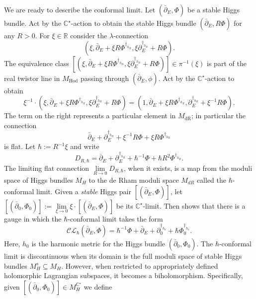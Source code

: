\documentclass[12pt,oneside,reqno]{amsart}
\theoremstyle{definition}
\numberwithin{equation}{section}
\numberwithin{theorem}{section}
\newcommand{\R}{\mathbb{R}}
\newcommand{\C}{\mathbb{C}}
\renewcommand{\subset}{\subseteq}
\newcommand{\pa}{\partial}
\newcommand{\delbar}{\bar\pa}
\newcommand{\Hod}{\operatorname{Hod}}
\newcommand{\dR}{\operatorname{dR}}
\begin{document}
We are ready to describe the conformal limit. Let $(\bar\pa_E,\Phi)$ be a stable Higgs bundle. Act by the $\C^{\star}$-action to obtain the stable Higgs bundle $(\bar\pa_E,R\Phi)$ for any $R>0$. For $\xi \in \R$ consider the $\lambda$-connection 
%
\begin{equation*}
(\xi, \bar\pa_E+ \xi R\Phi^{\dagger_{h_R}}, \xi\pa_E^{\dagger_{h_R}}+ R\Phi).
\end{equation*}
%
The equivalence class $[(\xi, \bar\pa_E+ \xi R\Phi^{\dagger_{h_R}}, \xi\pa_E^{\dagger_{h_R}}+ R\Phi)] \in \pi^{-1}(\xi)$ is part of the real twistor line in $M_{\Hod}$ passing through $(\bar\pa_E,\phi)$. Act by the $\C^{\star}$-action to obtain 
%
\begin{equation*}
\xi^{-1}\cdot(\xi, \bar\pa_E+ \xi R\Phi^{\dagger_{h_R}}, \xi\pa_E^{\dagger_{h_R}}+ R\Phi)= (1,\bar\pa_E+ \xi R\Phi^{\dagger_{h_R}}, \pa_E^{\dagger_{h_R}}+ \xi^{-1}R\Phi).
\end{equation*}
%
The term on the right represents a particular element in $M_{\dR}$; in particular the connection 
%
\begin{equation*}
\bar\pa_E + \pa_E^{\dagger_{h_R}} + \xi^{-1}R\Phi + \xi R\Phi^{\dagger_{h_R}}
\end{equation*}
is flat. Let $\hbar := R^{-1}\xi$ and write 
%
\begin{equation*}
D_{R,\hbar} = \bar\pa_E + \pa_E^{\dagger_{h_R}} + \hbar^{-1}\Phi +  \hbar R^2\Phi^{\dagger_{h_R}}.
\end{equation*}
%
The limiting flat connection $\lim\limits_{R\to 0} D_{R,\hbar}$, when it exists, is a map from the moduli space of Higgs bundles $M_H$ to the de Rham moduli space $M_{dR}$ called the $\hbar$-conformal limit. Given a \textit{stable} Higgs pair $[(\bar\pa_E,\Phi)]$, let $[(\bar\pa_0,\Phi_0)]:=\lim\limits_{\xi\to 0}\xi\cdot [(\bar\pa_E,\Phi)]$ be its $\mathbb C^{\star}$-limit. Then \cite{CW} shows that there is a gauge in which the $\hbar$-conformal limit takes the form 
%
\begin{equation}
    \mathcal {CL}_{\hbar}(\bar\pa_E,\Phi) = \hbar^{-1}\Phi + \bar\pa_E + \pa_0^{\dagger_{h_0}} + \hbar\Phi_0^{\dagger_{h_0}}.
\end{equation}
%
Here, $h_0$ is the harmonic metric for the Higgs bundle $(\delbar_0, \Phi_0)$. 
The $\hbar$-conformal limit is discontinuous when its domain is the full moduli space of stable Higgs bundles $M_H^s\subset M_H$. However, when restricted to appropriately defined holomorphic Lagrangian subspaces, it becomes a biholomorphism. Specifically, given $[(\bar\pa_0, \Phi_0)]\in M_H^{\mathbb C^{\star}}$ we define 
\end{document}
